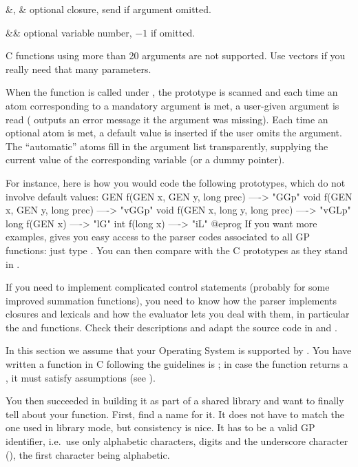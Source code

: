 \+&, & optional closure, send  if argument omitted.\cr

\+&& optional variable number, $-1$ if omitted.\cr

 C functions using more than 20 arguments are not
supported. Use vectors if you really need that many parameters.

When the function is called under , the prototype is scanned and each
time an atom corresponding to a mandatory argument is met, a user-given
argument is read ( outputs an error message it the argument was
missing). Each time an optional atom is met, a default value is inserted if the
user omits the argument. The ``automatic'' atoms fill in the argument list
transparently, supplying the current value of the corresponding variable (or a
dummy pointer).

For instance, here is how you would code the following prototypes, which
do not involve default values:
\bprog
GEN f(GEN x, GEN y, long prec)   ----> "GGp"
void f(GEN x, GEN y, long prec)  ----> "vGGp"
void f(GEN x, long y, long prec) ----> "vGLp"
long f(GEN x)                    ----> "lG"
int f(long x)                    ----> "iL"
@eprog\noindent
If you want more examples,  gives you easy access to the parser codes
associated to all GP functions: just type . You
can then compare with the C prototypes as they stand in .

 If you need to implement complicated control statements
(probably for some improved summation functions), you need to know
how the parser implements closures and lexicals and how the evaluator lets
you deal with them, in particular the  and 
functions. Check their descriptions and adapt the source code in
 and .


In this section we assume that your Operating System is supported by
. You have written a function in C following the guidelines is
; in case the function returns a , it
must satisfy  assumptions (see ).

You then succeeded in building it as part of a shared library and want to
finally tell  about your function. First, find a name for it. It does
not have to match the one used in library mode, but consistency is nice. It
has to be a valid GP identifier, i.e.~use only alphabetic characters, digits
and the underscore character (\kbd{\_}), the first character being
alphabetic.

